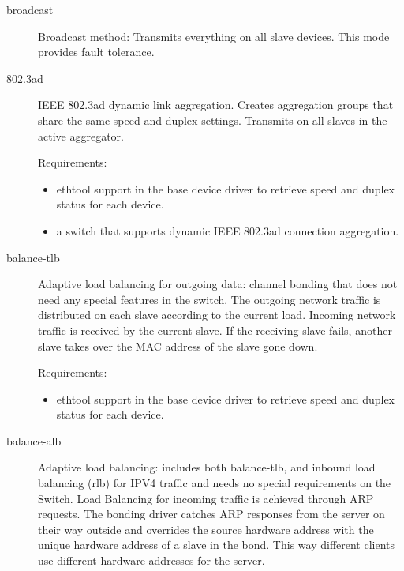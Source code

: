 \begin{description}
\begin{description}
\item [broadcast]

  Broadcast method: Transmits everything on all slave devices.
  This mode provides fault tolerance.

\item [802.3ad]

  IEEE 802.3ad dynamic link aggregation. Creates
  aggregation groups that share the same speed and duplex
  settings. Transmits on all slaves in the active aggregator.

  Requirements:
  \begin{itemize}

    \item ethtool support in the base device driver to retrieve
          speed and duplex status for each device.

    \item a switch that supports dynamic IEEE 802.3ad
          connection aggregation.

  \end{itemize}

\item [balance-tlb]

   Adaptive load balancing for outgoing data: channel bonding that
  does not need any special features in the switch. The outgoing
  network traffic is distributed on each slave according to the 
  current load. Incoming network traffic is received by the current
  slave. If the receiving slave fails, another slave takes over the
  MAC address of the slave gone down.
  
  Requirements:
  \begin{itemize}

    \item ethtool support in the base device driver to retrieve
          speed and duplex status for each device.
  \end{itemize}
  
\item [balance-alb]

  Adaptive load balancing: includes both balance-tlb, and inbound 
  load balancing (rlb) for IPV4 traffic and needs no special 
  requirements on the Switch. Load Balancing for incoming traffic 
  is achieved through ARP requests. The bonding driver catches ARP
  responses from the server on their way outside and overrides the 
  source hardware address with the unique hardware address of a slave
  in the bond. This way different clients use different hardware 
  addresses for the server.
  

\end{description}
\end{description}

